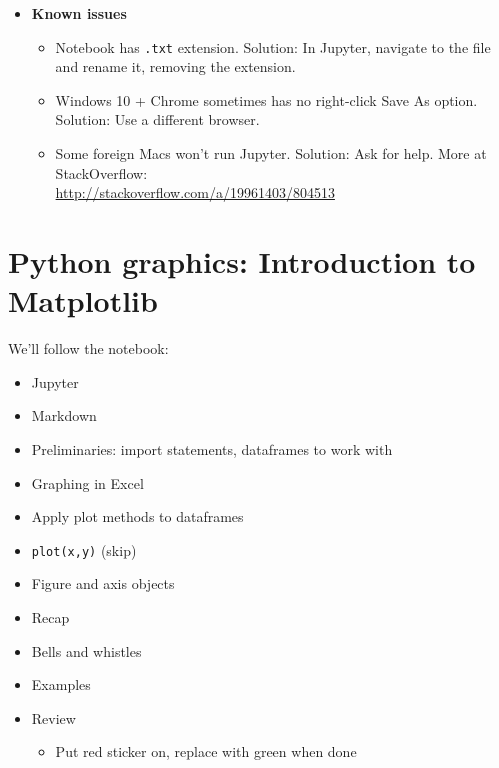 \documentclass[11pt]{article}
\begin{document}
\begin{itemize}
\item {\bf Known issues}
\begin{itemize}
\item Notebook has {\tt .txt} extension.  Solution:  In Jupyter, navigate to the file
and rename it, removing the extension.
\item Windows 10 + Chrome sometimes has no right-click Save As option.
Solution:  Use a different browser.
\item Some foreign Macs won't run Jupyter.  Solution:  Ask for help. More at StackOverflow: \\
\url{http://stackoverflow.com/a/19961403/804513}

\end{itemize}
\end{itemize}


\section*{Python graphics:  Introduction to Matplotlib}

We'll follow the notebook:
\begin{itemize}
\item Jupyter
\item Markdown
\item Preliminaries:  import statements, dataframes to work with
\item Graphing in Excel
\item Apply plot methods to dataframes
\item {\tt plot(x,y)} (skip)
\item Figure and axis objects
\item Recap
\item Bells and whistles
\item Examples
\item Review
\begin{itemize}
\item Put red sticker on, replace with green when done
\end{itemize}
\end{itemize}


\begin{comment}
\section*{Examples}

If time permits, we'll go through some examples of economic and financial data
and its properties.  It's an IPython notebook that you can view on the GitHub repo:
the \verb|Code/IPython| directory,
file \verb|bootcamp_examples.ipynb|.
\end{comment}
\end{document}
